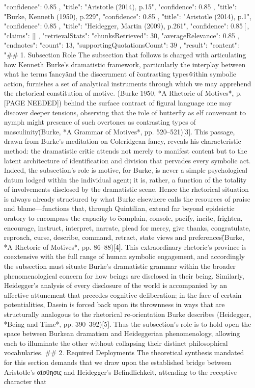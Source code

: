 {{{        "confidence": 0.85
      },
      {
        "title": "Aristotle (2014), p.15",
        "confidence": 0.85
      },
      {
        "title": "Burke, Kenneth (1950), p.229",
        "confidence": 0.85
      },
      {
        "title": "Aristotle (2014), p.1",
        "confidence": 0.85
      },
      {
        "title": "Heidegger, Martin (2009), p.261",
        "confidence": 0.85
      }
    ],
    "claims": []
  },
  "retrievalStats": {
    "chunksRetrieved": 30,
    "averageRelevance": 0.85
  },
  "endnotes": {
    "count": 13,
    "supportingQuotationsCount": 39
  },
  "result": {
    "content": "## 1. Subsection Role The subsection that follows is charged with articulating how Kenneth Burke's dramatistic framework, particularly the interplay between what he terms \"fancy\" and the discernment of \"contrasting types\" within symbolic action, furnishes a set of analytical instruments through which we may apprehend the rhetorical constitution of motive. (Burke 1950, *A Rhetoric of Motives*, p. [PAGE NEEDED]) behind the surface contract of figural language one may discover deeper tensions, observing that the \"role of butterfly as elf conversant to nymph might presence of such overtones as contrasting types of masculinity\" (Burke, *A Grammar of Motives*, pp. 520–521)[3]. This passage, drawn from Burke's meditation on Coleridgean fancy, reveals his characteristic method: the dramatistic critic attends not merely to manifest content but to the latent architecture of identification and division that pervades every symbolic act. Indeed, the subsection's role is motive, for Burke, is never a simple psychological datum lodged within the individual agent; it is, rather, a function of the totality of involvements disclosed by the dramatistic scene. Hence the rhetorical situation is always already structured by what Burke elsewhere calls the resources of praise and blame—functions that, through Quintilian, extend far beyond epideictic oratory to encompass the capacity to \"complain, console, pacify, incite, frighten, encourage, instruct, interpret, narrate, plead for mercy, give thanks, congratulate, reproach, curse, describe, command, retract, state views and preferences\" (Burke, *A Rhetoric of Motives*, pp. 86–88)[4]. This extraordinary rhetoric's province is coextensive with the full range of human symbolic engagement, and accordingly the subsection must situate Burke's dramatistic grammar within the broader phenomenological concern for how beings are disclosed in their being. Similarly, Heidegger's analysis of every disclosure of the world is accompanied by an affective attunement that precedes cognitive deliberation; in the face of certain potentialities, Dasein is forced back upon its thrownness in ways that are structurally analogous to the rhetorical re-orientation Burke describes (Heidegger, *Being and Time*, pp. 390–392)[5]. Thus the subsection's role is to hold open the space between Burkean dramatism and Heideggerian phenomenology, allowing each to illuminate the other without collapsing their distinct philosophical vocabularies. \n\n## 2. Required Deployments The theoretical synthesis mandated for this section demands that we draw upon the established bridge between Aristotle's αἴσθησις and Heidegger's Befindlichkeit, attending to the receptive character that }}
